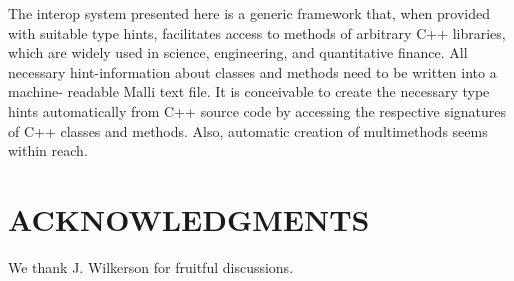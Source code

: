 \documentclass{IEEEcsmag}
\begin{document}
The interop system presented here is a generic framework that, when provided with suitable type hints, facilitates access to methods of arbitrary C++ libraries, which are widely used in science, engineering, and quantitative finance. All necessary hint-information about classes and methods need to be written into a machine- readable Malli text file. It is conceivable to create the necessary type hints automatically from C++ source code by accessing the respective signatures of C++ classes and methods. Also, automatic creation of multimethods seems within reach.\vspace*{-5pt}

\section{ACKNOWLEDGMENTS}
We thank J. Wilkerson for fruitful discussions.\vspace*{-5pt}

\def\refname{REFERENCES}
\end{document}
